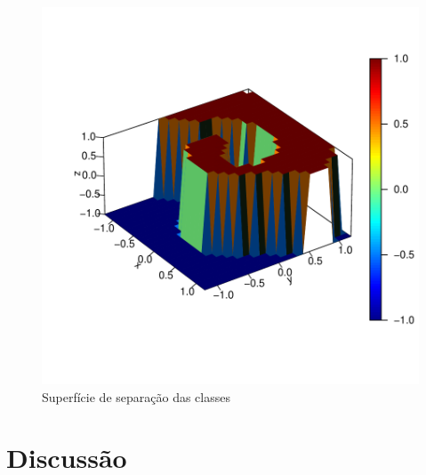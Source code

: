 \documentclass[12pt]{article}
\begin{document}
\begin{figure}[!h]
\centering
\includegraphics{SVM-007}
\caption{Superfície de separação das classes}
\label{3}
\end{figure}

\section{Discussão}
\end{document}
